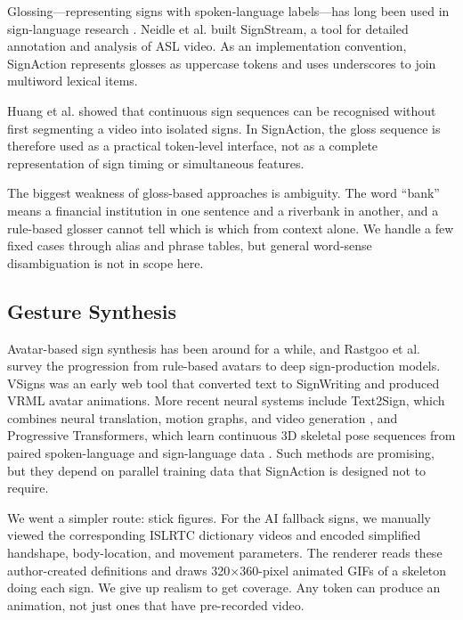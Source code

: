 \documentclass[conference]{IEEEtran}
\begin{document}
Glossing---representing signs with spoken-language labels---has long been used in sign-language research \cite{klima1979}. Neidle et al. \cite{neidle2001} built SignStream, a tool for detailed annotation and analysis of ASL video. As an implementation convention, SignAction represents glosses as uppercase tokens and uses underscores to join multiword lexical items.

Huang et al. \cite{huang2018} showed that continuous sign sequences can be recognised without first segmenting a video into isolated signs. In SignAction, the gloss sequence is therefore used as a practical token-level interface, not as a complete representation of sign timing or simultaneous features.

The biggest weakness of gloss-based approaches is ambiguity. The word ``bank'' means a financial institution in one sentence and a riverbank in another, and a rule-based glosser cannot tell which is which from context alone. We handle a few fixed cases through alias and phrase tables, but general word-sense disambiguation is not in scope here.

\subsection{Gesture Synthesis}

Avatar-based sign synthesis has been around for a while, and Rastgoo et al. \cite{rastgoo2021} survey the progression from rule-based avatars to deep sign-production models. VSigns \cite{papadogiorgaki2004} was an early web tool that converted text to SignWriting and produced VRML avatar animations. More recent neural systems include Text2Sign, which combines neural translation, motion graphs, and video generation \cite{stoll2020}, and Progressive Transformers, which learn continuous 3D skeletal pose sequences from paired spoken-language and sign-language data \cite{saunders2020}. Such methods are promising, but they depend on parallel training data that SignAction is designed not to require.

We went a simpler route: stick figures. For the AI fallback signs, we manually viewed the corresponding ISLRTC dictionary videos and encoded simplified handshape, body-location, and movement parameters. The renderer reads these author-created definitions and draws 320$\times$360-pixel animated GIFs of a skeleton doing each sign. We give up realism to get coverage. Any token can produce an animation, not just ones that have pre-recorded video.
\end{document}
